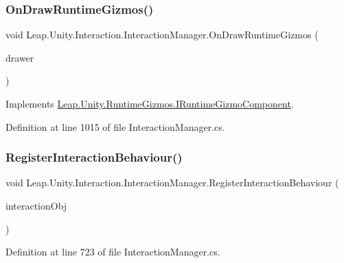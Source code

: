 \subsubsection{\texorpdfstring{OnDrawRuntimeGizmos()}{OnDrawRuntimeGizmos()}}
{\footnotesize\ttfamily void Leap.\+Unity.\+Interaction.\+Interaction\+Manager.\+On\+Draw\+Runtime\+Gizmos (\begin{DoxyParamCaption}\item[{\mbox{\hyperlink{class_leap_1_1_unity_1_1_runtime_gizmos_1_1_runtime_gizmo_drawer}{Runtime\+Gizmo\+Drawer}}}]{drawer }\end{DoxyParamCaption})}



Implements \mbox{\hyperlink{interface_leap_1_1_unity_1_1_runtime_gizmos_1_1_i_runtime_gizmo_component_abaa7cf174480d957b48d0023df50291d}{Leap.\+Unity.\+Runtime\+Gizmos.\+I\+Runtime\+Gizmo\+Component}}.



Definition at line 1015 of file Interaction\+Manager.\+cs.

\mbox{\label{class_leap_1_1_unity_1_1_interaction_1_1_interaction_manager_acc03ba640a74c7b100a7942c427b9ad9}} 
\subsubsection{\texorpdfstring{RegisterInteractionBehaviour()}{RegisterInteractionBehaviour()}}
{\footnotesize\ttfamily void Leap.\+Unity.\+Interaction.\+Interaction\+Manager.\+Register\+Interaction\+Behaviour (\begin{DoxyParamCaption}\item[{\mbox{\hyperlink{interface_leap_1_1_unity_1_1_interaction_1_1_i_interaction_behaviour}{I\+Interaction\+Behaviour}}}]{interaction\+Obj }\end{DoxyParamCaption})}



Definition at line 723 of file Interaction\+Manager.\+cs.

\mbox{\label{class_leap_1_1_unity_1_1_interaction_1_1_interaction_manager_ab3f0e103a262ec1e7a9689e243cb62ad}} 
